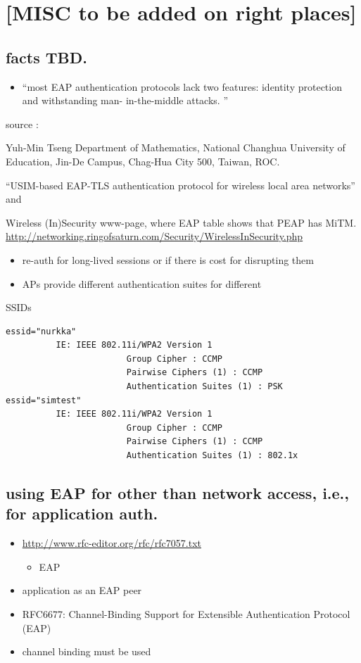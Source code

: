 \documentclass[12pt,a4paper,english]{tutthesis}
\begin{document}
\chapter{[MISC to be added on right places]}
\label{sec-8}
\section{facts TBD.}
\label{sec-8-1}
\begin{itemize}
\item ``most EAP authentication protocols lack two features: identity
protection and withstanding man- in-the-middle attacks. ''
\end{itemize}
source :

Yuh-Min Tseng Department of Mathematics, National Changhua University of Education,
Jin-De Campus, Chag-Hua City 500, Taiwan, ROC.

``USIM-based EAP-TLS authentication protocol for
wireless local area networks''
and 

Wireless (In)Security www-page, where 
EAP table shows that PEAP has MiTM.
\url{http://networking.ringofsaturn.com/Security/WirelessInSecurity.php}

\begin{itemize}
\item re-auth for long-lived sessions or if there is cost for disrupting them
\item APs provide different authentication suites for different
\end{itemize}
SSIDs 

\scriptsize
\begin{verbatim}
essid="nurkka"
          IE: IEEE 802.11i/WPA2 Version 1
                        Group Cipher : CCMP
                        Pairwise Ciphers (1) : CCMP
                        Authentication Suites (1) : PSK
essid="simtest"
          IE: IEEE 802.11i/WPA2 Version 1
                        Group Cipher : CCMP
                        Pairwise Ciphers (1) : CCMP
                        Authentication Suites (1) : 802.1x
\end{verbatim}
\normalsize

\section{using EAP for other than network access, i.e., for application auth.}
\label{sec-8-2}
\begin{itemize}
\item \url{http://www.rfc-editor.org/rfc/rfc7057.txt}
\begin{itemize}
\item EAP
\end{itemize}
\item application as an EAP peer
\item RFC6677: Channel-Binding Support for Extensible Authentication Protocol (EAP)
\item channel binding must be used
\end{itemize}
\end{document}
